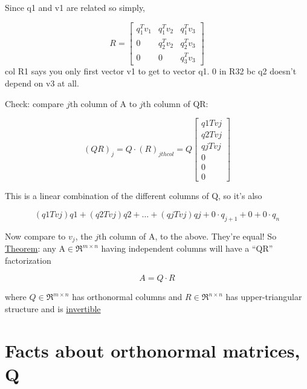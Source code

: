 \documentclass[twocolumn,draft]{article}
\begin{document}
 Since q1 and v1 are related so simply,
 
 \begin{equation}
 	R = \begin{bmatrix}
			q_{1}^{T}v_{1} & q_{1}^{T}v_{2} & q_{1}^{T}v_{3}\\
			0 			   & q_{2}^{T}v_{2} & q_{2}^{T}v_{3}\\
			0 			   & 	  0			& q_{3}^{T}v_{3}
 		\end{bmatrix}
 \end{equation}
 col R1 says you only first vector v1 to get to vector q1. 0 in R32 bc q2 doesn't depend on v3 at
 all.
 
 Check: compare $j$th column of A to $j$th column of QR:
 
 \begin{equation*}
 	(QR)_{j} = Q\cdot (R)_{jth col} = Q \begin{bmatrix}
											q1Tvj \\
											q2Tvj \\
											qjTvj \\
											0 \\
											0 \\
											0
										\end{bmatrix}
 \end{equation*}
  
  This is a linear combination of the different columns of Q, so it's also
  
  \begin{equation}
  	(q1Tvj)q1 + (q2Tvj)q2 + \ldots + (qjTvj)qj + 0\cdot q_{j+1} + 0 + 0\cdot q_{n}
  \end{equation}
  
  Now compare to $v_{j}$, the $j$th column of A, to the above. They're equal! So \\
  
  \noindent \underline{Theorem}: any A$\in\Re^{m\times n}$ having independent columns 
  will have a ``QR'' factorization
  
  \begin{equation}
  	A = Q \cdot R
  \end{equation}
  
  where $Q\in\Re^{m\times n}$ has orthonormal columns and $R\in\Re^{n\times n}$ has
  upper-triangular structure and is \underline{invertible}
  
  \section*{Facts about orthonormal matrices, Q}
  
\end{document}
